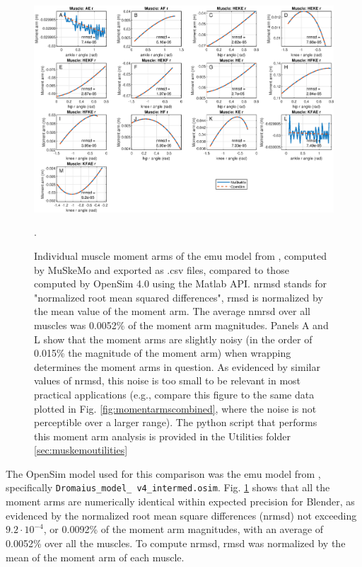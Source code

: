 \documentclass{article}
\begin{document}
\begin{figure}[htbp]
    \centering
    \includegraphics[width=1\textwidth]{figures/emu_momentarms_individual_v2.eps} %
    \caption{Individual muscle moment arms of the emu model from \cite{vanbijlertMusclecontrolledPhysicsSimulations2024}, computed by MuSkeMo and exported as .csv files, compared to those computed by OpenSim 4.0 using the Matlab API. nrmsd stands for "normalized root mean squared differences", rmsd is normalized by the mean value of the moment arm. The average nmrsd over all muscles was 0.0052\% of the moment arm magnitudes.
    Panels A and L show that the moment arms are slightly noisy (in the order of 0.015\% the magnitude of the moment arm) when wrapping determines the moment arms in question. As evidenced by similar values of nrmsd, this noise is too small to be relevant in most practical applications (e.g., compare this figure to the same data plotted in Fig. \ref{fig:momentarmscombined}, where the noise is not perceptible over a larger range).   
    The python script that performs this moment arm analysis is provided in the Utilities folder \ref{sec:muskemoutilities}}.
    \label{fig:momentarmsindividual}
\end{figure}

The OpenSim model used for this comparison was the emu model from \cite{vanbijlertMusclecontrolledPhysicsSimulations2024}, specifically \texttt{Dromaius\_model\_ \allowbreak v4\_intermed.\allowbreak osim}. Fig. \ref{fig:momentarmsindividual} shows that all the moment arms are numerically identical within expected precision for Blender, as evidenced by the normalized root mean square differences (nrmsd) not exceeding \(9.2 \cdot 10^{-4}\), or 0.0092\% of the moment arm magnitudes, with an average of 0.0052\% over all the muscles. To compute nrmsd, rmsd was normalized by the mean of the moment arm of each muscle.
\end{document}
